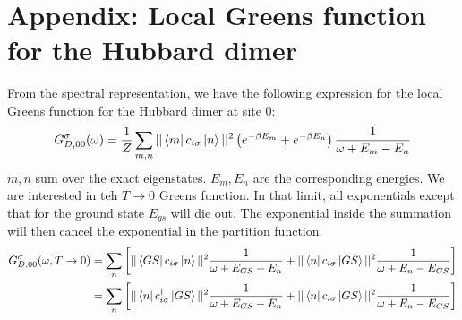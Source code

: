 \documentclass{article}
\numberwithin{equation}{section}
\begin{document}
\section*{Appendix: Local Greens function for the Hubbard dimer}
From the spectral representation, we have the following expression for the local Greens function for the Hubbard dimer at site $0$:
\begin{equation}\begin{aligned}
	G_{D,00}^\sigma(\omega) = \frac{1}{Z}\sum_{m,n}||\bra{m}c_{i\sigma}\ket{n}||^2\left( e^{-\beta E_m} + e^{-\beta E_n}\right)\frac{1}{\omega + E_m - E_n}
\end{aligned}\end{equation}
$m,n$ sum over the exact eigenstates. $E_m, E_n$ are the corresponding energies. We are interested in teh $T \to 0$ Greens function. In that limit, all exponentials except that for the ground state $E_{gs}$ will die out. The exponential inside the summation will then cancel the exponential in the partition function.
\begin{equation}\begin{aligned}
	G_{D,00}^\sigma(\omega, T \to 0) &= \sum_{n}\left[||\bra{GS}c_{i\sigma}\ket{n}||^2\frac{1}{\omega + E_{GS} - E_n} + ||\bra{n}c_{i\sigma}\ket{GS}||^2\frac{1}{\omega + E_n - E_{GS}}\right]\\
					&= \sum_{n}\left[||\bra{n}c^\dagger_{i\sigma}\ket{GS}||^2\frac{1}{\omega + E_{GS} - E_n} + ||\bra{n}c_{i\sigma}\ket{GS}||^2\frac{1}{\omega + E_n - E_{GS}}\right]\\
\end{aligned}\end{equation}
\end{document}
